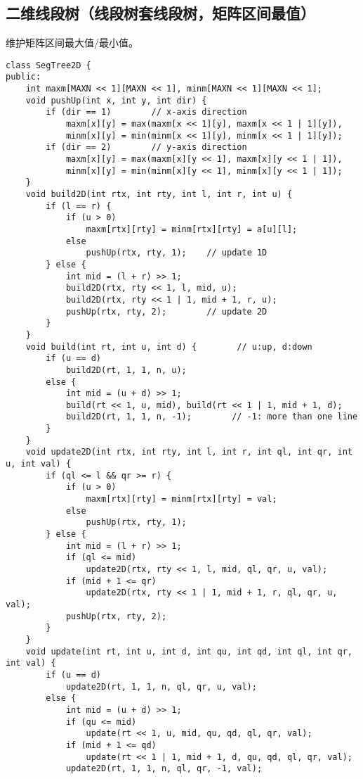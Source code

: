 \subsection{二维线段树（线段树套线段树，矩阵区间最值）}
\par 维护矩阵区间最大值/最小值。
\begin{verbatim}
class SegTree2D {
public:
    int maxm[MAXN << 1][MAXN << 1], minm[MAXN << 1][MAXN << 1];
    void pushUp(int x, int y, int dir) {
        if (dir == 1)        // x-axis direction
            maxm[x][y] = max(maxm[x << 1][y], maxm[x << 1 | 1][y]),
            minm[x][y] = min(minm[x << 1][y], minm[x << 1 | 1][y]);
        if (dir == 2)        // y-axis direction
            maxm[x][y] = max(maxm[x][y << 1], maxm[x][y << 1 | 1]),
            minm[x][y] = min(minm[x][y << 1], minm[x][y << 1 | 1]);
    }
    void build2D(int rtx, int rty, int l, int r, int u) {
        if (l == r) {
            if (u > 0)
                maxm[rtx][rty] = minm[rtx][rty] = a[u][l];
            else
                pushUp(rtx, rty, 1);    // update 1D
        } else {
            int mid = (l + r) >> 1;
            build2D(rtx, rty << 1, l, mid, u);
            build2D(rtx, rty << 1 | 1, mid + 1, r, u);
            pushUp(rtx, rty, 2);        // update 2D
        }
    }
    void build(int rt, int u, int d) {        // u:up, d:down
        if (u == d)
            build2D(rt, 1, 1, n, u);
        else {
            int mid = (u + d) >> 1;
            build(rt << 1, u, mid), build(rt << 1 | 1, mid + 1, d);
            build2D(rt, 1, 1, n, -1);        // -1: more than one line
        }
    }
    void update2D(int rtx, int rty, int l, int r, int ql, int qr, int u, int val) {
        if (ql <= l && qr >= r) {
            if (u > 0)
                maxm[rtx][rty] = minm[rtx][rty] = val;
            else
                pushUp(rtx, rty, 1);
        } else {
            int mid = (l + r) >> 1;
            if (ql <= mid)
                update2D(rtx, rty << 1, l, mid, ql, qr, u, val);
            if (mid + 1 <= qr)
                update2D(rtx, rty << 1 | 1, mid + 1, r, ql, qr, u, val);
            pushUp(rtx, rty, 2);
        }
    }
    void update(int rt, int u, int d, int qu, int qd, int ql, int qr, int val) {
        if (u == d)
            update2D(rt, 1, 1, n, ql, qr, u, val);
        else {
            int mid = (u + d) >> 1;
            if (qu <= mid)
                update(rt << 1, u, mid, qu, qd, ql, qr, val);
            if (mid + 1 <= qd)
                update(rt << 1 | 1, mid + 1, d, qu, qd, ql, qr, val);
            update2D(rt, 1, 1, n, ql, qr, -1, val);

\end{verbatim}
